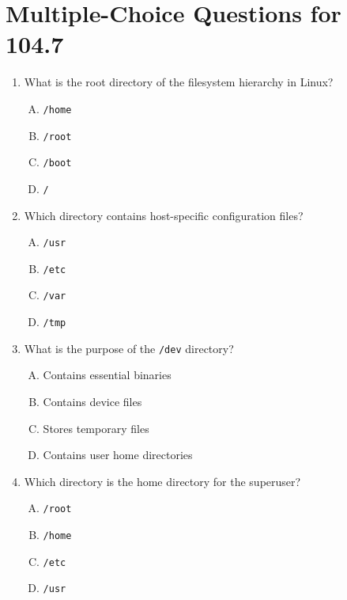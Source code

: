 \documentclass[a4paper]{report}
\begin{document}
\newpage
\section*{Multiple-Choice Questions for 104.7}
\begin{enumerate}[1.]

    \item What is the root directory of the filesystem hierarchy in Linux?  
    \begin{enumerate}[A)]
        \item \texttt{/home}  
        \item \texttt{/root}  
        \item \texttt{/boot}  
        \item \texttt{/}  
    \end{enumerate}

    \item Which directory contains host-specific configuration files?  
    \begin{enumerate}[A)]
        \item \texttt{/usr}  
        \item \texttt{/etc}  
        \item \texttt{/var}  
        \item \texttt{/tmp}  
    \end{enumerate}

    \item What is the purpose of the \texttt{/dev} directory?  
    \begin{enumerate}[A)]
        \item Contains essential binaries  
        \item Contains device files  
        \item Stores temporary files  
        \item Contains user home directories  
    \end{enumerate}

    \item Which directory is the home directory for the superuser?  
    \begin{enumerate}[A)]
        \item \texttt{/root}  
        \item \texttt{/home}  
        \item \texttt{/etc}  
        \item \texttt{/usr}  
    \end{enumerate}


\end{enumerate}
\end{document}
